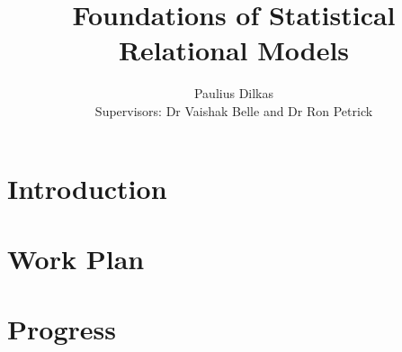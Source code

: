 \documentclass{article}
\title{Foundations of Statistical Relational Models}
\author{Paulius Dilkas \\[1ex] {\small Supervisors: Dr Vaishak Belle and Dr Ron
    Petrick}}
\affil{School of Informatics, University of Edinburgh}
\begin{document}
\maketitle

\section{Introduction}

\section{Work Plan}

\section{Progress}
\end{document}
